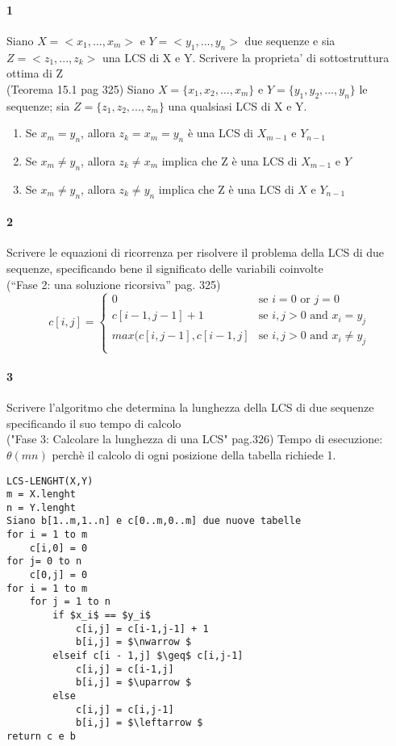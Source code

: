 \documentclass[12pt, a4paper, openany]{book}
\begin{document}
\paragraph{1}
Siano $X=<x_1,...,x_m>$ e $Y=< y_1,...,y_n>$ due sequenze e sia $Z=<z_1,...,z_k>$
una LCS di X e Y. Scrivere la proprieta’ di sottostruttura ottima di Z \\
(Teorema 15.1 pag 325)
Siano $X=\{x_1,x_2,...,x_m\}$ e $Y=\{y_1,y_2,...,y_n\}$ le sequenze; sia $Z=\{z_1,z_2,...,z_m\}$ una qualsiasi LCS di X e Y.
\begin{enumerate}
    \item Se $x_m = y_n$, allora $z_k = x_m =y_n$ è  una LCS di $X_{m-1}$ e $Y_{n-1}$
    \item Se $x_m \neq y_n$, allora $z_k \neq x_m$ implica che Z è una LCS di $X_{m-1}$ e $Y$
    \item Se $x_m \neq y_n$, allora $z_k \neq y_n$ implica che Z è una LCS di $X$ e $Y_{n-1}$
\end{enumerate}
\paragraph{2}
Scrivere le equazioni di ricorrenza per risolvere il problema della LCS di due
sequenze, specificando bene il significato delle variabili coinvolte \\
(“Fase 2: una soluzione ricorsiva” pag. 325)
\begin{equation*}
    c[i,j] = \begin{cases}
        0                      & \text{se $i = 0$ or $j = 0$}           \\
        c[i-1,j-1] + 1         & \text{se $i,j > 0$ and $x_i = y_j$}    \\
        max(c[i,j-1], c[i-1,j] & \text{se $i,j > 0$ and $x_i \neq y_j$} \\
    \end{cases}
\end{equation*}
\paragraph{3}
Scrivere l’algoritmo che determina la lunghezza della LCS di due sequenze
specificando il suo tempo di calcolo\\
("Fase 3: Calcolare la lunghezza di una LCS" pag.326)
Tempo di esecuzione: $\theta(mn)$ perchè il calcolo di ogni posizione della tabella richiede 1.

\begin{lstlisting}[mathescape=true]
LCS-LENGHT(X,Y)
m = X.lenght
n = Y.lenght
Siano b[1..m,1..n] e c[0..m,0..m] due nuove tabelle
for i = 1 to m
    c[i,0] = 0
for j= 0 to n
    c[0,j] = 0
for i = 1 to m
    for j = 1 to n
        if $x_i$ == $y_i$
            c[i,j] = c[i-1,j-1] + 1  
            b[i,j] = $\nwarrow $
        elseif c[i - 1,j] $\geq$ c[i,j-1]
            c[i,j] = c[i-1,j]  
            b[i,j] = $\uparrow $
        else
            c[i,j] = c[i,j-1]  
            b[i,j] = $\leftarrow $
return c e b
\end{lstlisting}
\end{document}
